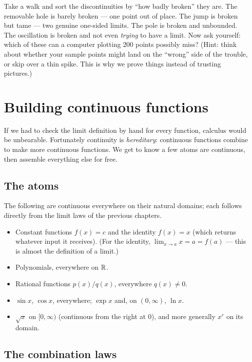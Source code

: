 \begin{walkbox}
Take a walk and sort the discontinuities by ``how badly broken'' they are. The removable
hole is barely broken --- one point out of place. The jump is broken but tame --- two
genuine one-sided limits. The pole is broken and unbounded. The oscillation is broken and
not even \emph{trying} to have a limit. Now ask yourself: which of these can a computer
plotting $200$ points possibly miss? (Hint: think about whether your sample points might
land on the ``wrong'' side of the trouble, or skip over a thin spike. This is why we prove
things instead of trusting pictures.)
\end{walkbox}

\section{Building continuous functions}
\label{ch08:building}

If we had to check the limit definition by hand for every function, calculus would be
unbearable. Fortunately continuity is \emph{hereditary}: continuous functions combine to
make more continuous functions. We get to know a few atoms are continuous, then assemble
everything else for free.

\subsection{The atoms}

The following are continuous everywhere on their natural domains; each follows directly
from the limit laws of the previous chapters.

\begin{itemize}
  \item Constant functions $f(x)=c$ and the identity $f(x)=x$ (which returns whatever input it receives). (For the identity,
        $\lim_{x\to a}x=a=f(a)$ --- this is almost the definition of a limit.)
  \item Polynomials, everywhere on $\mathbb{R}$.
  \item Rational functions $p(x)/q(x)$, everywhere $q(x)\ne 0$.
  \item $\sin x$, $\cos x$, everywhere; $\exp x$ and, on $(0,\infty)$, $\ln x$.
  \item $\sqrt{x}$ on $[0,\infty)$ (continuous from the right at $0$), and more
        generally $x^r$ on its domain.
\end{itemize}

\subsection{The combination laws}

